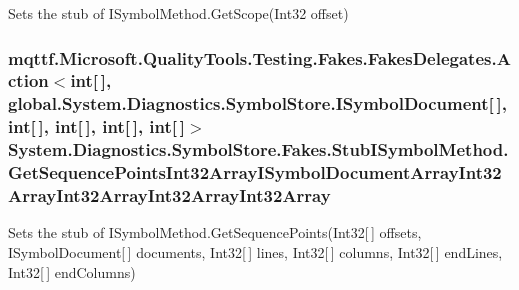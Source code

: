 Sets the stub of I\-Symbol\-Method.\-Get\-Scope(\-Int32 offset)

\hypertarget{class_system_1_1_diagnostics_1_1_symbol_store_1_1_fakes_1_1_stub_i_symbol_method_aa42a2e4e0749079374d179e328b12877}{
\subsubsection[{Get\-Sequence\-Points\-Int32\-Array\-I\-Symbol\-Document\-Array\-Int32\-Array\-Int32\-Array\-Int32\-Array\-Int32\-Array}]{\setlength{\rightskip}{0pt plus 5cm}mqttf.\-Microsoft.\-Quality\-Tools.\-Testing.\-Fakes.\-Fakes\-Delegates.\-Action$<$int\mbox{[}$\,$\mbox{]}, global.\-System.\-Diagnostics.\-Symbol\-Store.\-I\-Symbol\-Document\mbox{[}$\,$\mbox{]}, int\mbox{[}$\,$\mbox{]}, int\mbox{[}$\,$\mbox{]}, int\mbox{[}$\,$\mbox{]}, int\mbox{[}$\,$\mbox{]}$>$ System.\-Diagnostics.\-Symbol\-Store.\-Fakes.\-Stub\-I\-Symbol\-Method.\-Get\-Sequence\-Points\-Int32\-Array\-I\-Symbol\-Document\-Array\-Int32\-Array\-Int32\-Array\-Int32\-Array\-Int32\-Array}}\label{class_system_1_1_diagnostics_1_1_symbol_store_1_1_fakes_1_1_stub_i_symbol_method_aa42a2e4e0749079374d179e328b12877}


Sets the stub of I\-Symbol\-Method.\-Get\-Sequence\-Points(\-Int32\mbox{[}$\,$\mbox{]} offsets, I\-Symbol\-Document\mbox{[}$\,$\mbox{]} documents, Int32\mbox{[}$\,$\mbox{]} lines, Int32\mbox{[}$\,$\mbox{]} columns, Int32\mbox{[}$\,$\mbox{]} end\-Lines, Int32\mbox{[}$\,$\mbox{]} end\-Columns)

